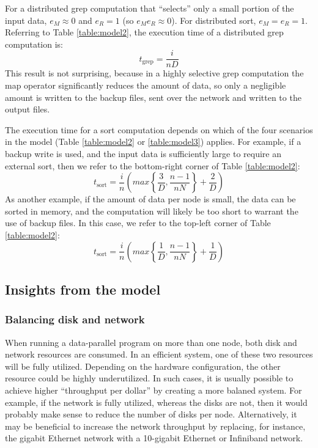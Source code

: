 \documentclass{acm_proc_article-sp}
\begin{document}
For a distributed grep computation that ``selects'' only a small portion of the input data, $e_M \approx 0$ and $e_R = 1$ (so $e_M e_R \approx 0$). For distributed sort, $e_M = e_R = 1$. Referring to Table \ref{table:model2}, the execution time of a distributed grep computation is:
\begin{equation}
t_\text{grep} = \frac{i}{n D}
\label{eqn:grepmodel}
\end{equation}
This result is not surprising, because in a highly selective grep computation
the map operator significantly reduces the amount of data, so only a negligible
amount is written to the backup files, sent over the network and written to the output
files.

The execution time for a sort computation depends on which of the four
scenarios in the model (Table \ref{table:model2} or \ref{table:model3})
applies. For example, if a backup write is used, and the input data is sufficiently large to require an
external sort, then we refer to the bottom-right corner of Table
\ref{table:model2}:
\begin{equation}
t_\text{sort} = \frac{i}{n} \left( max\left\{\frac{3}{D}, \frac{n-1}{n
N}\right\} + \frac{2}{D} \right)
\label{eqn:sortmodel1}
\end{equation}
As another example, if the amount of data per node is small, the data can be sorted in memory, and the computation will likely be too short to warrant the use of backup files. In this case, we refer to the top-left corner of Table \ref{table:model2}:
\begin{equation}
t_\text{sort} = \frac{i}{n} \left( max\left\{\frac{1}{D}, \frac{n-1}{n
N}\right\} + \frac{1}{D} \right)
\label{eqn:sortmodel2}
\end{equation}

\subsection{Insights from the model}

\subsubsection{Balancing disk and network}

When running a data-parallel program on more than one node, both disk and
network resources are consumed. In an efficient system, one of these two
resources will be fully utilized. Depending on the hardware configuration, the
other resource could be highly underutilized. In such cases, it is usually
possible to achieve higher ``throughput per dollar'' by creating a more balaned
system. For example, if the network is fully utilized, whereas the disks are
not, then it would probably make sense to reduce the number of disks per node.
Alternatively, it may be beneficial to increase the network throughput by
replacing, for instance, the gigabit Ethernet network with a 10-gigabit Ethernet or Infiniband network.
\end{document}
